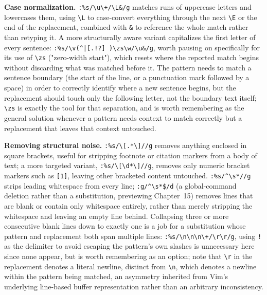 \textbf{Case normalization.} \texttt{:\%s/\textbackslash u\textbackslash+/\textbackslash L\&/g} matches runs of uppercase letters and lowercases them, using \texttt{\textbackslash L} to case-convert everything through the next \texttt{\textbackslash E} or the end of the replacement, combined with \texttt{\&} to reference the whole match rather than retyping it. A more structurally aware variant capitalizes the first letter of every sentence: \texttt{:\%s/\textbackslash v(\textasciicircum|[.!?] )\textbackslash zs\textbackslash w/\textbackslash u\&/g}, worth pausing on specifically for its use of \texttt{\textbackslash zs} ("zero-width start"), which resets where the reported match begins without discarding what was matched before it. The pattern needs to match a sentence boundary (the start of the line, or a punctuation mark followed by a space) in order to correctly identify where a new sentence begins, but the replacement should touch only the following letter, not the boundary text itself; \texttt{\textbackslash zs} is exactly the tool for that separation, and is worth remembering as the general solution whenever a pattern needs context to match correctly but a replacement that leaves that context untouched.

\textbf{Removing structural noise.} \texttt{:\%s/\textbackslash[.*\textbackslash]//g} removes anything enclosed in square brackets, useful for stripping footnote or citation markers from a body of text; a more targeted variant, \texttt{:\%s/\textbackslash[\textbackslash d*\textbackslash]//g}, removes only numeric bracket markers such as \texttt{[1]}, leaving other bracketed content untouched. \texttt{:\%s/\textasciicircum\textbackslash s*//g} strips leading whitespace from every line; \texttt{:g/\textasciicircum\textbackslash s*\$/d} (a global-command deletion rather than a substitution, previewing Chapter~15) removes lines that are blank or contain only whitespace entirely, rather than merely stripping the whitespace and leaving an empty line behind. Collapsing three or more consecutive blank lines down to exactly one is a job for a substitution whose pattern and replacement both span multiple lines: \texttt{:\%s/\textbackslash n\textbackslash n\textbackslash n\textbackslash+/\textbackslash r\textbackslash r/g}, using \texttt{!} as the delimiter to avoid escaping the pattern's own slashes is unnecessary here since none appear, but is worth remembering as an option; note that \texttt{\textbackslash r} in the replacement denotes a literal newline, distinct from \texttt{\textbackslash n}, which denotes a newline within the pattern being matched, an asymmetry inherited from Vim's underlying line-based buffer representation rather than an arbitrary inconsistency.

